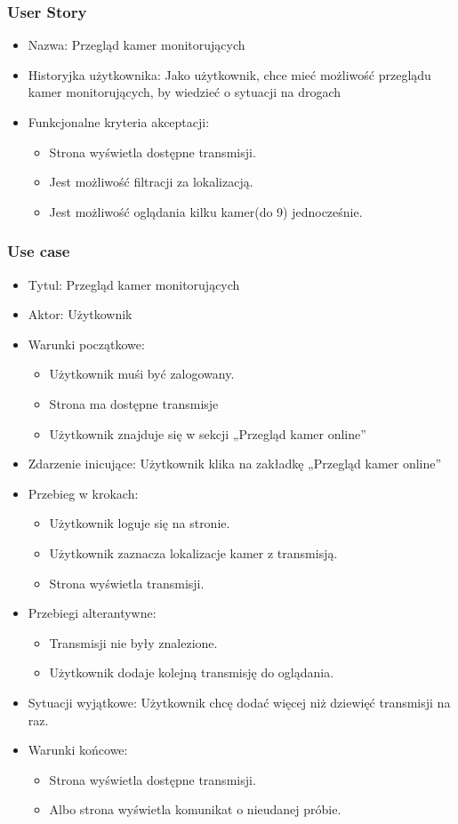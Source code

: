 \documentclass[12pt]{article}
\begin{document}
\subsubsection{User Story}
\begin{itemize}
\item Nazwa: Przegląd kamer monitorujących
\item Historyjka użytkownika: Jako użytkownik, chce mieć możliwość przeglądu kamer monitorujących, by wiedzieć o sytuacji na drogach
\item Funkcjonalne kryteria akceptacji: 
	\begin{itemize}
	\item Strona wyświetla dostępne transmisji.
	\item Jest możliwość filtracji za lokalizacją.
	\item Jest możliwość oglądania kilku kamer(do 9) jednocześnie.
	\end{itemize}
\end{itemize}

\subsubsection{Use case}
\begin{itemize}
\item Tytul: Przegląd kamer monitorujących
\item Aktor: Użytkownik
\item Warunki początkowe: 
	\begin{itemize}
	\item Użytkownik muśi być zalogowany.
	\item Strona ma dostępne transmisje
	\item Użytkownik znajduje się w sekcji „Przegląd kamer online”
	\end{itemize}
\item Zdarzenie inicujące: Użytkownik klika na zakładkę „Przegląd kamer online”
\item Przebieg w krokach:
	\begin{itemize}
	\item Użytkownik loguje się na stronie.
	\item Użytkownik zaznacza lokalizacje kamer z transmisją.
	\item Strona wyświetla transmisji.
	\end{itemize}
\item Przebiegi alterantywne: 
	\begin{itemize}
	\item Transmisji nie były znalezione.
	\item Użytkownik dodaje kolejną transmisję do oglądania.
	\end{itemize}
\item Sytuacji wyjątkowe: Użytkownik chcę dodać więcej niż dziewięć transmisji na raz.
\item Warunki końcowe:
	\begin{itemize}
	\item Strona wyświetla dostępne transmisji.
	\item Albo strona wyświetla komunikat o nieudanej próbie.
	\end{itemize}
\end{itemize}
\end{document}
